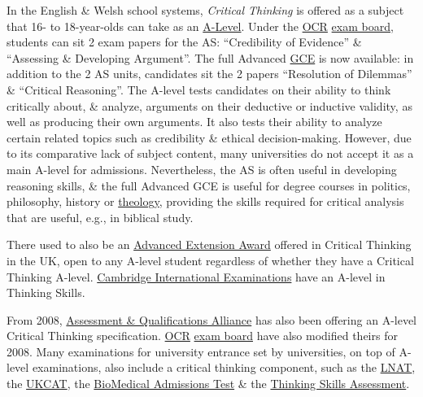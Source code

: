 \documentclass[oneside]{book}
\numberwithin{equation}{section}
\begin{document}
In the English \& Welsh school systems, \textit{Critical Thinking} is offered as a subject that 16- to 18-year-olds can take as an \href{https://en.wikipedia.org/wiki/Advanced_Level_(UK)}{A-Level}. Under the \href{https://en.wikipedia.org/wiki/OCR_(exam_board)}{OCR} \href{https://en.wikipedia.org/wiki/Exam_board}{exam board}, students can sit 2 exam papers for the AS: ``Credibility of Evidence'' \& ``Assessing \& Developing Argument''. The full Advanced \href{https://en.wikipedia.org/wiki/General_Certificate_of_Education}{GCE} is now available: in addition to the 2 AS units, candidates sit the 2 papers ``Resolution of Dilemmas'' \& ``Critical Reasoning''. The A-level tests candidates on their ability to think critically about, \& analyze, arguments on their deductive or inductive validity, as well as producing their own arguments. It also tests their ability to analyze certain related topics such as credibility \& ethical decision-making. However, due to its comparative lack of subject content, many universities do not accept it as a main A-level for admissions. Nevertheless, the AS is often useful in developing reasoning skills, \& the full Advanced GCE is useful for degree courses in politics, philosophy, history or \href{https://en.wikipedia.org/wiki/Theology}{theology}, providing the skills required for critical analysis that are useful, e.g., in biblical study.

There used to also be an \href{https://en.wikipedia.org/wiki/Advanced_Extension_Award}{Advanced Extension Award} offered in Critical Thinking in the UK, open to any A-level student regardless of whether they have a Critical Thinking A-level. \href{https://en.wikipedia.org/wiki/Cambridge_International_Examinations}{Cambridge International Examinations} have an A-level in Thinking Skills.

From 2008, \href{https://en.wikipedia.org/wiki/Assessment_and_Qualifications_Alliance}{Assessment \& Qualifications Alliance} has also been offering an A-level Critical Thinking specification. \href{https://en.wikipedia.org/wiki/OCR_(exam_board)}{OCR} \href{https://en.wikipedia.org/wiki/Exam_board}{exam board} have also modified theirs for 2008. Many examinations for university entrance set by universities, on top of A-level examinations, also include a critical thinking component, such as the \href{https://en.wikipedia.org/wiki/LNAT}{LNAT}, the \href{https://en.wikipedia.org/wiki/UKCAT}{UKCAT}, the \href{https://en.wikipedia.org/wiki/BioMedical_Admissions_Test}{BioMedical Admissions Test} \& the \href{https://en.wikipedia.org/wiki/Thinking_Skills_Assessment}{Thinking Skills Assessment}.
\end{document}
